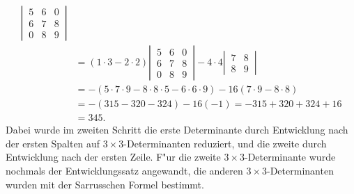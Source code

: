 \begin{loesung}
\begin{teilaufgaben}
\begin{align*}
\left|\,\begin{matrix}
5&6&0\\
6&7&8\\
0&8&9
\end{matrix}\,\right|
\\
&
=
(1\cdot 3-2\cdot 2)
\left|\,\begin{matrix}
5&6&0\\
6&7&8\\
0&8&9
\end{matrix}\,\right|
-4\cdot 4
\left|\,\begin{matrix}
7&8\\
8&9
\end{matrix}\,\right|
\\
&
=
-(5\cdot7\cdot9-8\cdot8\cdot 5-6\cdot 6\cdot 9)-16(7\cdot 9-8\cdot 8)
\\
&
=
-(315-320-324)-16(-1)=-315+320+324+16
\\
&
=345.
\end{align*}
Dabei wurde im zweiten Schritt die erste Determinante durch Entwicklung
nach der ersten Spalten auf $3\times 3$-Determinanten reduziert,
und die zweite durch Entwicklung nach der ersten Zeile. F"ur die
zweite $3\times 3$-Determinante wurde nochmals der Entwicklungssatz angewandt,
die anderen $3\times 3$-Determi\-nanten wurden mit der Sarrusschen Formel
bestimmt.


\end{teilaufgaben}
\end{loesung}
